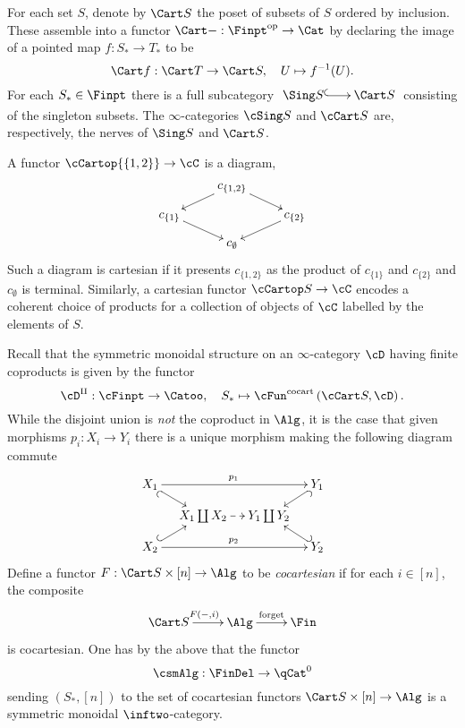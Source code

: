 \documentclass[a4paper]{article}
\numberwithin{equation}{section}
\begin{document}
 For each set $S$, denote by $\Cart S$ the poset of subsets of $S$ ordered by inclusion. These assemble into a functor $\Cart -: \Finpt^{\rm op} \to \Cat$ by declaring the image of a pointed map $f:S_* \to T_*$ to be
 \begin{equation*}
  \Cart f: \Cart T \to \Cart S, \quad U \mapsto f^{-1}(U).
 \end{equation*}
For each $S_* \in \Finpt$ there is a full subcategory $\xymatrixcolsep{1.5pc}\xymatrix{\Sing S \ar@{^{(}->}[r] & \Cart S}$ consisting of the singleton subsets. The $\infty$-categories $\cSing S$ and $\cCart S$ are, respectively, the nerves of $\Sing S$ and $\Cart S$.

\begin{exam}
A functor $\cCartop {\{1,2\}}\to \cC$ is a diagram,
\begin{equation*}
 \xymatrixrowsep{.8pc}\xymatrix{ & c_{\{1,2\}} \ar[rd] \ar[ld] & \\
 c_{\{1\}} \ar[rd] & &\ar[ld] c_{\{2\}} \\
  & c_{\emptyset} & }
\end{equation*}
Such a diagram is cartesian if it presents $c_{\{1,2\}}$ as the product of $c_{\{1\}}$ and $c_{\{2\}}$ and $c_{\emptyset}$ is terminal. Similarly, a cartesian functor $\cCartop S\to \cC$ encodes a coherent choice of products for a collection of objects of $\cC$ labelled by the elements of $S$.
\end{exam}

Recall that the symmetric monoidal structure on an $\infty$-category $\cD$ having finite coproducts is given by the functor
\begin{equation*}
 \cD^\amalg: \cFinpt \to \Catoo, \quad S_* \mapsto \cFun^{\rm cocart}\left( \cCart S, \cD \right).
\end{equation*}
While the disjoint union is {\em not} the coproduct in $\Alg$, it is the case that given morphisms $p_i:X_i \to Y_i$ there is a unique morphism making the following diagram commute
\begin{equation*}
 \xymatrixrowsep{.8pc}\xymatrixcolsep{.9pc}\xymatrix{X_1 \ar[rrr]^{p_1} \ar@{_{(}->}[rd] & &  & Y_1 \ar@{^{(}->}[ld]\\
  & X_1 \coprod X_2 \ar@{-->}[r] & Y_1 \coprod Y_2 & \\
  X_2 \ar[rrr]^{p_2} \ar@{^{(}->}[ru] & &  & Y_2 \ar@{_{(}->}[lu]} 
\end{equation*}
Define a functor $F:\Cart S \times [n] \to \Alg$ to be {\em cocartesian} if for each $i \in [n]$, the composite
\begin{equation*}
 \xymatrix{\Cart S \ar[r]^{F(-,i)} & \Alg \ar[r]^{\rm forget} & \Fin}
\end{equation*}
is cocartesian. One has by the above that the functor 
\begin{equation*}
\csmAlg: \FinDel \to \qCat^0
\end{equation*}
sending $(S_*,[n])$ to the set of cocartesian functors $\Cart S \times [n] \to \Alg$ is a symmetric monoidal $\inftwo$-category.
\end{document}
